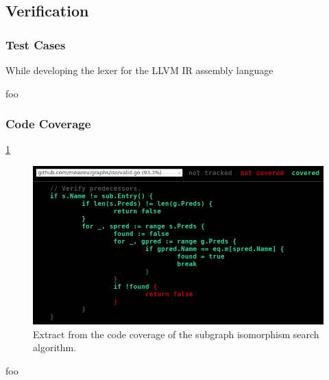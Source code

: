 \documentclass[12pt, a4paper]{article}
\begin{document}

\subsection{Verification}

\subsubsection{Test Cases}


While developing the lexer for the LLVM IR assembly language

foo

\subsubsection{Code Coverage}

\ref{iso_code_coverage}

\begin{figure}[htbp]
	\begin{center}
		\includegraphics[width=\textwidth]{inc/iso_code_coverage.png}
		\caption{Extract from the code coverage of the subgraph isomorphism search algorithm.}
		\label{iso_code_coverage}
	\end{center}
\end{figure}

foo

\end{document}
